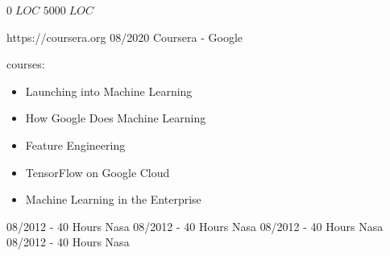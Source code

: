 \documentclass[10pt,fleqn,a4paper]{article}
\begin{document}
  \pgfplotsset{compat=1.11} %
  \begin{paracol}{2}
    \begin{adjustwidth}{5mm}{38mm} %
      \head %

          {\footnotesize $0 \; LOC$ \Arrow{25mm} $5000 \; LOC$}

      \newpage 
      \head %
            {https://coursera.org}
            {08/2020}
            {Coursera - Google}
            {courses:
            \begin{itemize}[leftmargin=*]
              \item Launching into Machine Learning
              \item How Google Does Machine Learning
              \item Feature Engineering
              \item TensorFlow on Google Cloud
              \item Machine Learning in the Enterprise
            \end{itemize}
          }

            {08/2012 - 40 Hours}
            {Nasa}
            {08/2012 - 40 Hours}
            {Nasa}
            {08/2012 - 40 Hours}
            {Nasa}
            {08/2012 - 40 Hours}
            {Nasa}


\end{adjustwidth}
\end{paracol}
\end{document}
